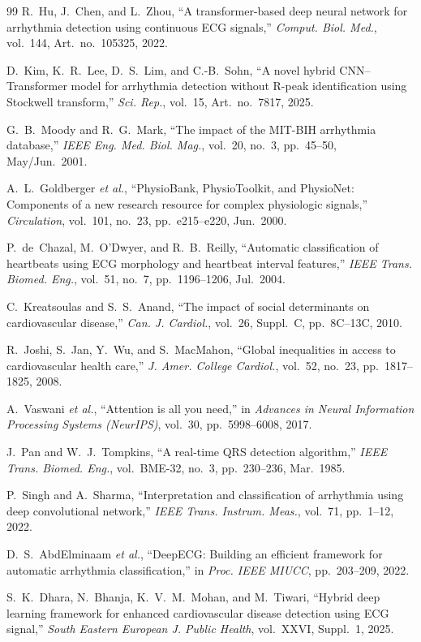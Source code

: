 \documentclass[conference]{IEEEtran}
\begin{document}
\begin{thebibliography}{99}
R.~Hu, J.~Chen, and L.~Zhou, ``A transformer-based deep neural network for arrhythmia detection using continuous ECG signals,'' \emph{Comput. Biol. Med.}, vol.~144, Art.~no.~105325, 2022.
 
D.~Kim, K.~R.~Lee, D.~S.~Lim, and C.-B.~Sohn, ``A novel hybrid CNN--Transformer model for arrhythmia detection without R-peak identification using Stockwell transform,'' \emph{Sci. Rep.}, vol.~15, Art.~no.~7817, 2025.
 
G.~B.~Moody and R.~G.~Mark, ``The impact of the MIT-BIH arrhythmia database,'' \emph{IEEE Eng. Med. Biol. Mag.}, vol.~20, no.~3, pp.~45--50, May/Jun.~2001.
 
A.~L.~Goldberger \emph{et al.}, ``PhysioBank, PhysioToolkit, and PhysioNet: Components of a new research resource for complex physiologic signals,'' \emph{Circulation}, vol.~101, no.~23, pp.~e215--e220, Jun.~2000.
 
P.~de~Chazal, M.~O'Dwyer, and R.~B.~Reilly, ``Automatic classification of heartbeats using ECG morphology and heartbeat interval features,'' \emph{IEEE Trans. Biomed. Eng.}, vol.~51, no.~7, pp.~1196--1206, Jul.~2004.
 
C.~Kreatsoulas and S.~S.~Anand, ``The impact of social determinants on cardiovascular disease,'' \emph{Can. J. Cardiol.}, vol.~26, Suppl.~C, pp.~8C--13C, 2010.
 
R.~Joshi, S.~Jan, Y.~Wu, and S.~MacMahon, ``Global inequalities in access to cardiovascular health care,'' \emph{J. Amer. College Cardiol.}, vol.~52, no.~23, pp.~1817--1825, 2008.
 
A.~Vaswani \emph{et al.}, ``Attention is all you need,'' in \emph{Advances in Neural Information Processing Systems (NeurIPS)}, vol.~30, pp.~5998--6008, 2017.
 
J.~Pan and W.~J.~Tompkins, ``A real-time QRS detection algorithm,'' \emph{IEEE Trans. Biomed. Eng.}, vol.~BME-32, no.~3, pp.~230--236, Mar.~1985.
 
P.~Singh and A.~Sharma, ``Interpretation and classification of arrhythmia using deep convolutional network,'' \emph{IEEE Trans. Instrum. Meas.}, vol.~71, pp.~1--12, 2022.
 
D.~S.~AbdElminaam \emph{et al.}, ``DeepECG: Building an efficient framework for automatic arrhythmia classification,'' in \emph{Proc. IEEE MIUCC}, pp.~203--209, 2022.
 
S.~K.~Dhara, N.~Bhanja, K.~V.~M.~Mohan, and M.~Tiwari, ``Hybrid deep learning framework for enhanced cardiovascular disease detection using ECG signal,'' \emph{South Eastern European J. Public Health}, vol.~XXVI, Suppl.~1, 2025.
 
\end{thebibliography}
 
\end{document}
